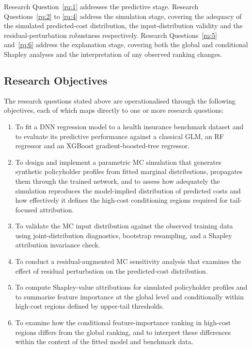 Research Question~\ref{rq:1} addresses the predictive stage.  Research
Questions~\ref{rq:2} to \ref{rq:4} address the simulation stage, covering the adequacy of the
simulated predicted-cost distribution, the input-distribution validity and the
residual-perturbation robustness respectively.  Research Questions~\ref{rq:5}
and~\ref{rq:6} address the explanation stage, covering both the global and
conditional Shapley analyses and the interpretation of any observed
ranking changes.


\subsection{Research Objectives}
\label{sec:research_objectives}

The research questions stated above are operationalised through the
following objectives, each of which maps directly to one or more research
questions:

\begin{enumerate}
    \item To fit a DNN regression model to a health
          insurance benchmark dataset and to evaluate its predictive
          performance against a classical GLM, an
          RF regressor and an XGBoost gradient-boosted-tree regressor.

    \item To design and implement a parametric MC simulation
          that generates synthetic policyholder profiles from fitted
          marginal distributions, propagates them through the trained
          network, and to assess how adequately the simulation
          reproduces the model-implied distribution of predicted costs
          and how effectively it defines the high-cost conditioning
          regions required for tail-focused attribution.

    \item To validate the MC input distribution against the
          observed training data using joint-distribution diagnostics,
          bootstrap resampling, and a Shapley attribution invariance
          check.

    \item To conduct a residual-augmented MC sensitivity
          analysis that examines the effect of residual perturbation on
          the predicted-cost distribution.

    \item To compute Shapley-value attributions for simulated
          policyholder profiles and to summarise feature importance at
          the global level and conditionally within high-cost regions
          defined by upper-tail thresholds.

    \item To examine how the conditional feature-importance ranking in
          high-cost regions differs from the global ranking, and to
          interpret these differences within the context of the fitted
          model and benchmark data.
\end{enumerate}

